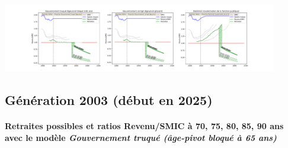  \begin{center}\includegraphics[width=0.9\textwidth]{fig/AdjTech_1990_22_dest_retraite.pdf}\end{center} \label{fig/AdjTech_1990_22_dest_retraite.pdf} 

\newpage 
 
\subsection{Génération 2003 (début en 2025)} 

\paragraph{Retraites possibles et ratios Revenu/SMIC à 70, 75, 80, 85, 90 ans avec le modèle \emph{Gouvernement truqué (âge-pivot bloqué à 65 ans)}}  
 
